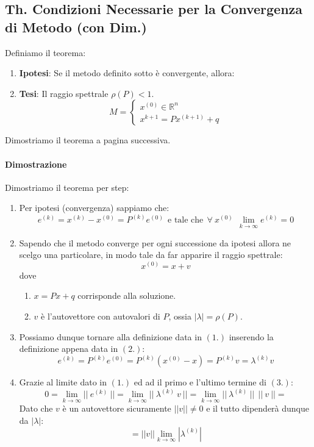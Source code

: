 \documentclass{article}
\begin{document}
\subsection{Th. Condizioni Necessarie per la Convergenza di Metodo (con Dim.)}

Definiamo il teorema:

\begin{enumerate}
    \item \textbf{Ipotesi}: Se il metodo definito sotto è convergente, allora:
    \item \textbf{Tesi}: Il raggio spettrale $\rho(P) < 1$.
    \vspace*{10px}
    \[ M = \left\{ \begin{array}{rcl}
        x^{(0)} \in \mathbb{R}^{n} \\ 
        x^{k+1} = Px^{(k+1)} + q 
        \end{array}\right.
         \]
\end{enumerate}

Dimostriamo il teorema a pagina successiva.

\newpage

\paragraph{Dimostrazione} Dimostriamo il teorema per step:

\begin{enumerate}
    \item Per ipotesi (convergenza) sappiamo che:
    \[ e^{(k)} = x^{(k)} - x^{(0)} = P^{(k)}e^{(0)} \:\: \text{e tale che} \:\: \forall \: x^{(0)} \: \: \lim_{k \rightarrow \infty} e^{(k)} = 0\]
    \item Sapendo che il metodo converge per ogni successione da ipotesi allora ne scelgo una particolare, in modo tale da far apparire il raggio spettrale:
    \[ x^{(0)} = x + v \]
    dove
    \begin{enumerate}
        \item $x = Px + q$ corrisponde alla soluzione.
        \item $v$ è l'autovettore con autovalori di $P$, ossia $|\lambda| = \rho(P)$.
    \end{enumerate}
    \item Possiamo dunque tornare alla definizione data in $(1.)$ inserendo la definizione appena data in $(2.)$:
    \[ e^{(k)} = P^{(k)}e^{(0)} = P^{(k)}(x^{(0)} - x) = P^{(k)}v = \lambda^{(k)}v \]
    \item Grazie al limite dato in $(1.)$ ed ad il primo e l'ultimo termine di $(3.)$:
    \[ 0 = \lim_{k \rightarrow \infty} ||\:e^{(k)}\:|| = \lim_{k \rightarrow \infty} ||\:\lambda^{(k)} \: v \:|| = \lim_{k \rightarrow \infty} ||\:\lambda^{(k)} \:||\:\:||\: v \:|| = \]
    Dato che $v$ è un autovettore sicuramente $||v|| \neq 0$ e il tutto dipenderà dunque da $|\lambda|$:
    \[ = ||v|| \lim_{k \rightarrow \infty} |\lambda^{(k)}| \]
\end{enumerate}
\end{document}
